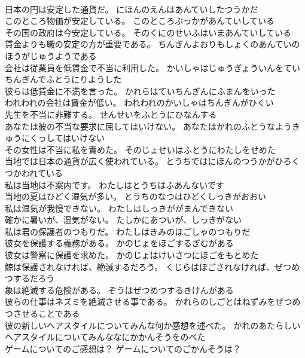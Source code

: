 \documentclass[8pt]{extreport}
\begin{document}
\begin{CJK}{UTF8}{min}
\\	日本の円は安定した通貨だ。	にほんのえんはあんていしたつうかだ 
\\	このところ物価が安定している。	このところぶっかがあんていしている 
\\	その国の政府は今安定している。	そのくにのせいふはいまあんていしている 
\\	賃金よりも職の安定の方が重要である。	ちんぎんよおりもしょくのあんていのほうがじゅうようである 
\\	会社は従業員を低賃金で不当に利用した。	かいしゃはじゅうぎょういんをていちんぎんでふとうにりようした 
\\	彼らは低賃金に不満を言った。	かれらはていちんぎんにふまんをいった 
\\	われわれの会社は賃金が低い。	われわれのかいしゃはちんぎんがひくい 
\\	先生を不当に非難する。	せんせいをふとうにひなんする 
\\	あなたは彼の不当な要求に屈してはいけない。	あなたはかれのふとうなようきゅうにくっしてはいけない 
\\	その女性は不当に私を責めた。	そのじょせいはふとうにわたしをせめた 
\\	当地では日本の通貨が広く使われている。	とうちではにほんのつうかがひろくつかわれている 
\\	私は当地は不案内です。	わたしはとうちはふあんないです 
\\	当地の夏はひどく湿気が多い。	とうちのなつはひどくしっきがおおい 
\\	私は湿気が我慢できない。	わたしはしっきががまんできない 
\\	確かに暑いが、湿気がない。	たしかにあついが、しっきがない 
\\	私は君の保護者のつもりだ。	わたしはきみのほごしゃのつもりだ 
\\	彼女を保護する義務がある。	かのじょをほごするぎむがある 
\\	彼女は警察に保護を求めた。	かのじょはけいさつにほごをもとめた 
\\	鯨は保護されなければ、絶滅するだろう。	くじらはほごされなければ、ぜつめつするだろう 
\\	象は絶滅する危険がある。	ぞうはぜつめつするきけんがある 
\\	彼らの仕事はネズミを絶滅させる事である。	かれらのしごとはねずみをぜつめつさせることである 
\\	彼の新しいヘアスタイルについてみんな何か感想を述べた。	かれのあたらしいヘアスタイルについてみんななにかかんそうをのべた 
\\	ゲームについてのご感想は？	ゲームについてのごかんそうは？ 

\end{CJK}
\end{document}
